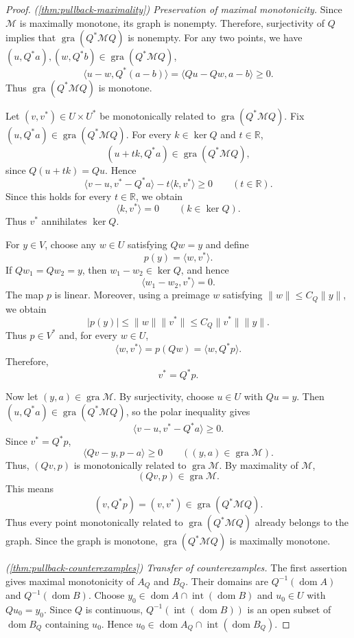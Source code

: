 \documentclass[11pt]{article}
\newcommand{\R}{\mathbb R}
\newcommand{\gra}{\operatorname{gra}}
\newcommand{\dom}{\operatorname{dom}}
\newcommand{\pair}[2]{\langle #1,#2\rangle}
\theoremstyle{definition}
\theoremstyle{remark}
\begin{document}
\begin{proof}
\noindent\textit{\textup{(\ref{thm:pullback-maximality})} Preservation of maximal monotonicity.}
Since $\mathcal M$ is maximally monotone, its graph is nonempty. Therefore, surjectivity of $Q$ implies that $\gra(Q^*\mathcal M Q)$ is nonempty. For any two points, we have 
$(u,Q^*a),(w,Q^*b)\in\gra(Q^*\mathcal M Q)$,
\[
\pair{u-w}{Q^*(a-b)}
=
\pair{Qu-Qw}{a-b}
\ge0.
\]
Thus $\gra(Q^*\mathcal M Q)$ is monotone.

Let $(v,v^*)\in U\times U^*$ be monotonically related to
$\gra(Q^*\mathcal M Q)$. Fix
$(u,Q^*a)\in\gra(Q^*\mathcal M Q)$. For every
$k\in\ker Q$ and $t\in\R$,
\[
(u+tk,Q^*a)\in\gra(Q^*\mathcal M Q),
\]
since $Q(u+tk)=Qu$. Hence
\[
\pair{v-u}{v^*-Q^*a}
-t\pair{k}{v^*}\ge0
\qquad(t\in\R).
\]
Since this holds for every $t\in\R$, we obtain
\[
\pair{k}{v^*}=0
\qquad(k\in\ker Q).
\]
Thus $v^*$ annihilates $\ker Q$.

For $y\in V$, choose any $w\in U$ satisfying $Qw=y$ and define
\[
p(y)=\pair{w}{v^*}.
\]
If $Qw_1=Qw_2=y$, then
$w_1-w_2\in\ker Q$, and hence
\[
\pair{w_1-w_2}{v^*}=0.
\]
The map $p$ is linear. Moreover, using a preimage $w$ satisfying
$\|w\|\le C_Q\|y\|$, we obtain
\[
|p(y)|
\le
\|w\|\|v^*\|
\le
C_Q\|v^*\|\|y\|.
\]
Thus $p\in V^*$ and, for every $w\in U$,
\[
\pair{w}{v^*}
=
p(Qw)
=
\pair{w}{Q^*p}.
\]
Therefore,
\[
v^*=Q^*p.
\]

Now let $(y,a)\in\gra\mathcal M$. By surjectivity, choose
$u\in U$ with $Qu=y$. Then
$(u,Q^*a)\in\gra(Q^*\mathcal M Q)$, so the polar inequality gives
\[
\pair{v-u}{v^*-Q^*a}\ge0.
\]
Since $v^*=Q^*p$,
\[
\pair{Qv-y}{p-a}\ge0
\qquad((y,a)\in\gra\mathcal M).
\]
Thus, $(Qv,p)$ is monotonically related to $\gra\mathcal M$. By maximality of $\mathcal M$,
\[
(Qv,p)\in\gra\mathcal M.
\]
This means
\[
(v,Q^*p)=(v,v^*)\in\gra(Q^*\mathcal M Q).
\]
Thus every point monotonically related to
$\gra(Q^*\mathcal M Q)$ already belongs to the graph. Since the graph is monotone, $\gra(Q^*\mathcal M Q)$ is maximally monotone.

\noindent\textit{\textup{(\ref{thm:pullback-counterexamples})} Transfer of counterexamples.}
The first assertion gives maximal monotonicity of $A_Q$ and $B_Q$. Their domains are $Q^{-1}(\dom A)$ and $Q^{-1}(\dom B)$. Choose $y_0\in\dom A\cap\operatorname{int}(\dom B)$ and $u_0\in U$ with $Qu_0=y_0$. Since $Q$ is continuous, $Q^{-1}(\operatorname{int}(\dom B))$ is an open subset of $\dom B_Q$ containing $u_0$. Hence $u_0\in\dom A_Q\cap\operatorname{int}(\dom B_Q)$.


\end{proof}
\end{document}
